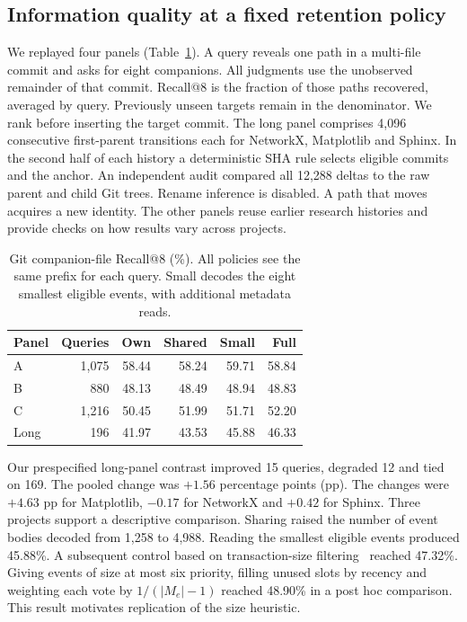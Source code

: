 \documentclass[conference]{IEEEtran}
\begin{document}
\subsection{Information quality at a fixed retention policy}
We replayed four panels (Table~\ref{tab:recall}). A query reveals one path in a multi-file commit and asks for eight companions. All judgments use the unobserved remainder of that commit. Recall@8 is the fraction of those paths recovered, averaged by query. Previously unseen targets remain in the denominator. We rank before inserting the target commit. The long panel comprises 4,096 consecutive first-parent transitions each for NetworkX, Matplotlib and Sphinx. In the second half of each history a deterministic SHA rule selects eligible commits and the anchor. An independent audit compared all 12,288 deltas to the raw parent and child Git trees. Rename inference is disabled. A path that moves acquires a new identity. The other panels reuse earlier research histories and provide checks on how results vary across projects.

\begin{table}[t]
\caption{Git companion-file Recall@8 (\%). All policies see the same prefix for each query. Small decodes the eight smallest eligible events, with additional metadata reads.}
\label{tab:recall}\centering\small
\begin{tabular}{@{}lrrrrr@{}}\toprule
Panel & Queries & Own & Shared & Small & Full\\\midrule
A & 1,075 & 58.44 & 58.24 & 59.71 & 58.84\\
B & 880 & 48.13 & 48.49 & 48.94 & 48.83\\
C & 1,216 & 50.45 & 51.99 & 51.71 & 52.20\\
Long & 196 & 41.97 & 43.53 & 45.88 & 46.33\\\bottomrule
\end{tabular}
\end{table}

Our prespecified long-panel contrast improved 15 queries, degraded 12 and tied on 169. The pooled change was $+1.56$ percentage points (pp). The changes were $+4.63$ pp for Matplotlib, $-0.17$ for NetworkX and $+0.42$ for Sphinx. Three projects support a descriptive comparison. Sharing raised the number of event bodies decoded from 1,258 to 4,988. Reading the smallest eligible events produced 45.88\%. A subsequent control based on transaction-size filtering~\cite{moonen} reached 47.32\%. Giving events of size at most six priority, filling unused slots by recency and weighting each vote by $1/(|M_e|-1)$ reached 48.90\% in a post hoc comparison. This result motivates replication of the size heuristic.
\end{document}
